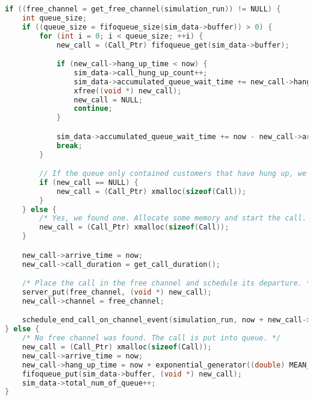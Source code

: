 \begin{lstlisting}[language=c,caption=Hang Up \& Connect or Wait on Call Arrival, label=list:exp4_arrival]
if ((free_channel = get_free_channel(simulation_run)) != NULL) {
	int queue_size;
	if ((queue_size = fifoqueue_size(sim_data->buffer)) > 0) {
		for (int i = 0; i < queue_size; ++i) {
			new_call = (Call_Ptr) fifoqueue_get(sim_data->buffer);

			if (new_call->hang_up_time < now) {
				sim_data->call_hung_up_count++;
				sim_data->accumulated_queue_wait_time += new_call->hang_up_time - new_call->arrive_time;
				xfree((void *) new_call);
				new_call = NULL;
				continue;
			}

			sim_data->accumulated_queue_wait_time += now - new_call->arrive_time;
			break;
		}

		// If the queue only contained customers that have hung up, we need to allocate some memory for the new call
		if (new_call == NULL) {
			new_call = (Call_Ptr) xmalloc(sizeof(Call));
		}
	} else {
		/* Yes, we found one. Allocate some memory and start the call. */
		new_call = (Call_Ptr) xmalloc(sizeof(Call));
	}

	new_call->arrive_time = now;
	new_call->call_duration = get_call_duration();

	/* Place the call in the free channel and schedule its departure. */
	server_put(free_channel, (void *) new_call);
	new_call->channel = free_channel;

	schedule_end_call_on_channel_event(simulation_run, now + new_call->call_duration, (void *) free_channel);
} else {
	/* No free channel was found. The call is put into queue. */
	new_call = (Call_Ptr) xmalloc(sizeof(Call));
	new_call->arrive_time = now;
	new_call->hang_up_time = now + exponential_generator((double) MEAN_HANG_UP_TIME);
	fifoqueue_put(sim_data->buffer, (void *) new_call);
	sim_data->total_num_of_queue++;
}
\end{lstlisting}
	
